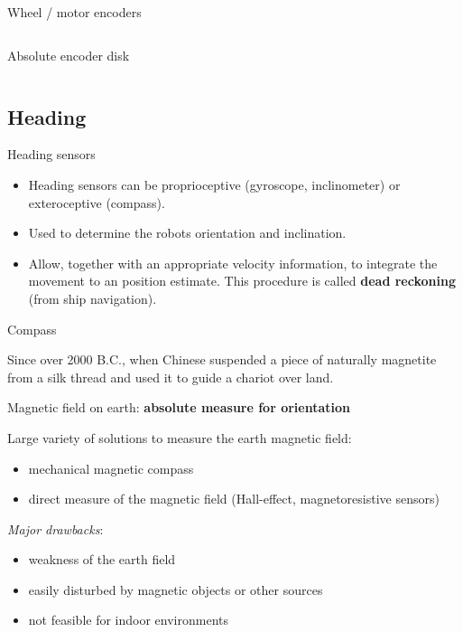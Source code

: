 \documentclass[compress]{beamer}
\begin{document}
\begin{frame}{Wheel / motor encoders}
\begin{columns}
\begin{column}{0.5\linewidth}
            Absolute encoder disk
        \end{column}
    \end{columns}


\end{frame}

\subsection{Heading}
\begin{frame}{Heading sensors}

    \begin{itemize}
        \item Heading sensors can be proprioceptive (gyroscope, inclinometer) or
              exteroceptive (compass).

        \item Used to determine the robots orientation and inclination.

        \item Allow, together with an appropriate velocity information, to integrate the
              movement to an position estimate. This procedure is called
              {\bf dead reckoning} (from ship navigation).

    \end{itemize}
\end{frame}

\begin{frame}{Compass}

    Since over 2000 B.C., when Chinese suspended a piece of naturally magnetite from a silk
    thread and used it to guide a chariot over land.

    Magnetic field on earth: {\bf absolute measure for orientation}

    Large variety of solutions to measure the earth magnetic field:
    \begin{itemize}
        \item mechanical magnetic compass
        \item direct measure of the magnetic field (Hall-effect, magnetoresistive
              sensors)
    \end{itemize}

    \emph{Major drawbacks}:

    \begin{itemize}
        \item weakness of the earth field
        \item easily disturbed by magnetic objects or other sources
        \item not feasible for indoor environments
    \end{itemize}

\end{frame}
\end{document}
